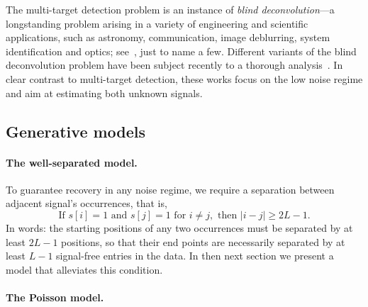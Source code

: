 \documentclass[12pt]{article}
\newcommand{\1}{\mathbf{1}}
\theoremstyle{plain}
\theoremstyle{definition}
\theoremstyle{remark}
\theoremstyle{plain}
\theoremstyle{remark}
\theoremstyle{plain}
\theoremstyle{plain}
\theoremstyle{plain}
\numberwithin{equation}{section}
\begin{document}
The multi-target detection problem  is an instance of  
\emph{blind deconvolution}---a longstanding problem arising in a variety of engineering and scientific applications, such as astronomy, communication, image deblurring, system identification and optics; see~\cite{jefferies1993restoration,shalvi1990new,ayers1988iterative,abed1997blind}, just to name a few. 
Different variants of the blind deconvolution problem have been subject recently to a thorough  analysis~\cite{ahmed2014blind,li2016identifiability,li2016rapid,lee2017blind,ling2017blind,kuo2019geometry}. In clear contrast to multi-target detection, these works focus on the low noise regime and aim at estimating both unknown signals.



\subsection{Generative models}

\paragraph{The well-separated model.}
To guarantee recovery in any noise regime, we require a separation between adjacent signal's occurrences, that is,
\begin{equation}
\textrm{If } s[i] = 1 \textrm{ and } s[j] = 1 \textrm{ for } i \neq j, \textrm{ then } |i - j| \geq 2L-1.
\label{eq:spacing}
\end{equation}
In words: the starting positions of any two occurrences  must be separated by at least $2L-1$ positions, so that their end points are necessarily separated by at least $L-1$ signal-free entries in the data.
In then next section we present a model that alleviates this condition.

\paragraph{The Poisson model.}
\end{document}

